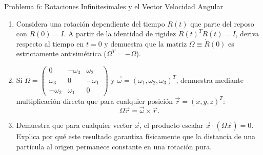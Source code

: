 \documentclass[11pt,letterpaper]{article}
\begin{document}
\begin{infobox}{Problema 6: Rotaciones Infinitesimales y el Vector Velocidad Angular}
\begin{enumerate}[label=(\alph*)]
    \item Considera una rotación dependiente del tiempo $R(t)$ que parte del reposo con $R(0) = I$. A partir de la identidad de rigidez $R(t)^T R(t) = I$, deriva respecto al tiempo en $t=0$ y demuestra que la matriz $\Omega \equiv \dot{R}(0)$ es estrictamente antisimétrica ($\Omega^T = -\Omega$).
    \item Si $\Omega = \begin{pmatrix} 0 & -\omega_3 & \omega_2 \\ \omega_3 & 0 & -\omega_1 \\ -\omega_2 & \omega_1 & 0 \end{pmatrix}$ y $\vec{\omega} = (\omega_1, \omega_2, \omega_3)^T$, demuestra mediante multiplicación directa que para cualquier posición $\vec{r} = (x, y, z)^T$:
    \[
    \Omega\vec{r} = \vec{\omega} \times \vec{r}.
    \]
    \item Demuestra que para cualquier vector $\vec{x}$, el producto escalar $\vec{x} \cdot (\Omega\vec{x}) = 0$. Explica por qué este resultado garantiza físicamente que la distancia de una partícula al origen permanece constante en una rotación pura.
\end{enumerate}
\end{infobox}
\end{document}
